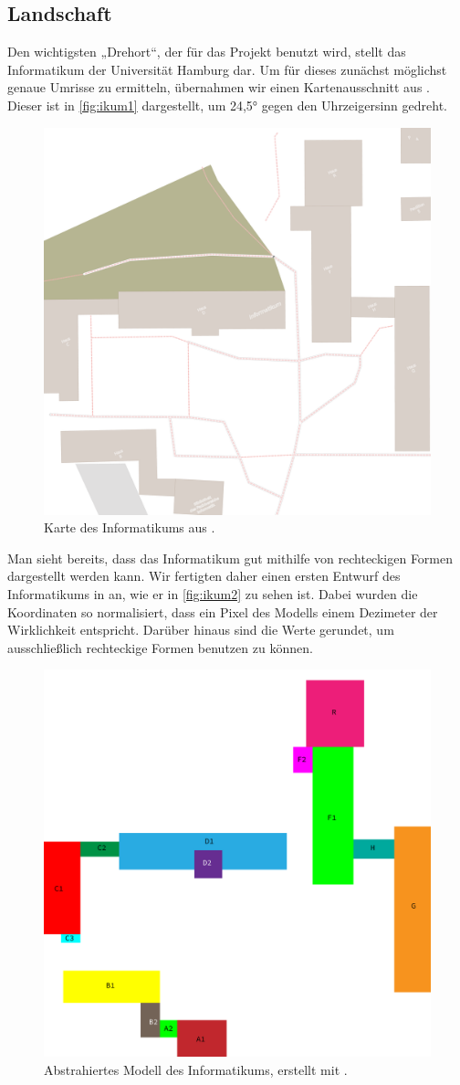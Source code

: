 \subsection{Landschaft}

Den wichtigsten „Drehort“, der für das Projekt benutzt wird, stellt das Informatikum der Universität Hamburg dar. Um für dieses zunächst möglichst genaue Umrisse zu ermitteln, übernahmen wir einen Kartenausschnitt aus \OSM. Dieser ist in \autoref{fig:ikum1} dargestellt, um 24,5° gegen den Uhrzeigersinn gedreht.

\begin{figure}[h]
	\centering
	\includegraphics[width=0.55\linewidth]{Landscape/Informatikum/Informatikum1}
	\caption{Karte des Informatikums aus \OSM.}
	\label{fig:ikum1}
\end{figure}

Man sieht bereits, dass das Informatikum gut mithilfe von rechteckigen Formen dargestellt werden kann. Wir fertigten daher einen ersten Entwurf des Informatikums in \Illustrator an, wie er in \autoref{fig:ikum2} zu sehen ist. Dabei wurden die Koordinaten so normalisiert, dass ein Pixel des Modells einem Dezimeter der Wirklichkeit entspricht. Darüber hinaus sind die Werte gerundet, um ausschließlich rechteckige Formen benutzen zu können.

\begin{figure}[h]
	\centering
	\includegraphics[width=0.55\linewidth]{Landscape/Informatikum/Informatikum2}
	\caption{Abstrahiertes Modell des Informatikums, erstellt mit \Illustrator.}
	\label{fig:ikum2}
\end{figure}

